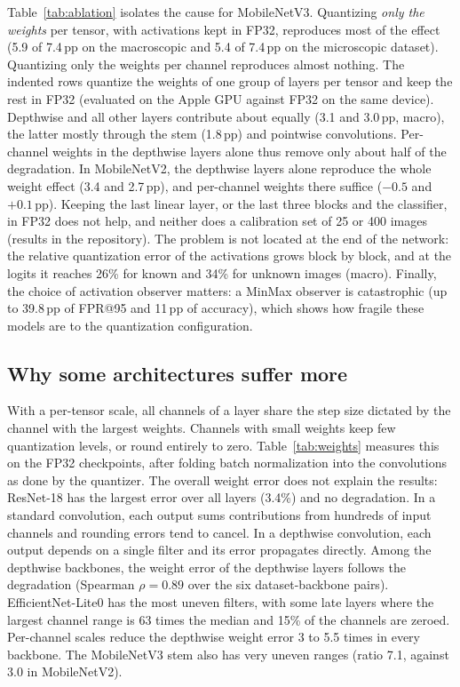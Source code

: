 \documentclass[conference]{IEEEtran}
\begin{document}
Table~\ref{tab:ablation} isolates the cause for MobileNetV3. Quantizing \emph{only the weights} per tensor, with activations kept in FP32, reproduces most of the effect (5.9 of 7.4\,pp on the macroscopic and 5.4 of 7.4\,pp on the microscopic dataset). Quantizing only the weights per channel reproduces almost nothing. The indented rows quantize the weights of one group of layers per tensor and keep the rest in FP32 (evaluated on the Apple GPU against FP32 on the same device). Depthwise and all other layers contribute about equally (3.1 and 3.0\,pp, macro), the latter mostly through the stem (1.8\,pp) and pointwise convolutions. Per-channel weights in the depthwise layers alone thus remove only about half of the degradation. In MobileNetV2, the depthwise layers alone reproduce the whole weight effect (3.4 and 2.7\,pp), and per-channel weights there suffice ($-0.5$ and $+0.1$\,pp). Keeping the last linear layer, or the last three blocks and the classifier, in FP32 does not help, and neither does a calibration set of 25 or 400 images (results in the repository). The problem is not located at the end of the network: the relative quantization error of the activations grows block by block, and at the logits it reaches 26\% for known and 34\% for unknown images (macro). Finally, the choice of activation observer matters: a MinMax observer is catastrophic (up to 39.8\,pp of FPR@95 and 11\,pp of accuracy), which shows how fragile these models are to the quantization configuration.

\subsection{Why some architectures suffer more}



With a per-tensor scale, all channels of a layer share the step size dictated by the channel with the largest weights. Channels with small weights keep few quantization levels, or round entirely to zero. Table~\ref{tab:weights} measures this on the FP32 checkpoints, after folding batch normalization into the convolutions as done by the quantizer. The overall weight error does not explain the results: ResNet-18 has the largest error over all layers (3.4\%) and no degradation. In a standard convolution, each output sums contributions from hundreds of input channels and rounding errors tend to cancel. In a depthwise convolution, each output depends on a single filter and its error propagates directly. Among the depthwise backbones, the weight error of the depthwise layers follows the degradation (Spearman $\rho=0.89$ over the six dataset-backbone pairs). EfficientNet-Lite0 has the most uneven filters, with some late layers where the largest channel range is 63 times the median and 15\% of the channels are zeroed. Per-channel scales reduce the depthwise weight error 3 to 5.5 times in every backbone. The MobileNetV3 stem also has very uneven ranges (ratio 7.1, against 3.0 in MobileNetV2).
\end{document}
